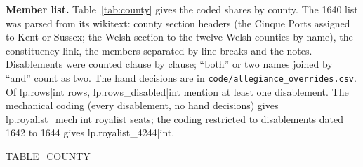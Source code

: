 \documentclass[11pt,a4paper]{article}
\begin{document}
\textbf{Member list.} Table~\ref{tab:county} gives the coded shares by county. The 1640 list was parsed from its wikitext: county section headers (the Cinque Ports assigned to Kent or Sussex; the Welsh section to the twelve Welsh counties by name), the constituency link, the members separated by line breaks and the notes. Disablements were counted clause by clause; ``both'' or two names joined by ``and'' count as two. The hand decisions are in \texttt{code/allegiance\_overrides.csv}. Of {{lp.rows|int}} rows, {{lp.rows_disabled|int}} mention at least one disablement. The mechanical coding (every disablement, no hand decisions) gives {{lp.royalist_mech|int}} royalist seats; the coding restricted to disablements dated 1642 to 1644 gives {{lp.royalist_4244|int}}.

{{TABLE_COUNTY}}
\end{document}
